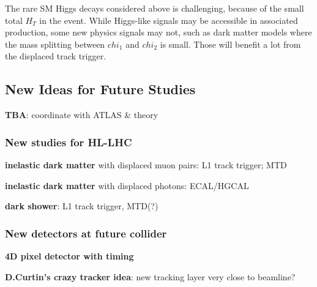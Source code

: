 The rare SM Higgs decays considered above is challenging, because of the small total $H_T$ in the event. 
While Higgs-like signals may be accessible in associated production, some new physics signals may not, such as dark matter models where the mass splitting between $chi_1$ and $chi_2$ is small. 
Those will benefit a lot from the displaced track trigger.

\subsection{New Ideas for Future Studies} \label{sec:upgradeideas}

\textbf{TBA}: coordinate with ATLAS \& theory

\subsubsection{New studies for HL-LHC} 

\textbf{inelastic dark matter} with displaced muon pairs: L1 track trigger; MTD

\textbf{inelastic dark matter} with displaced photons: ECAL/HGCAL

\textbf{dark shower}: L1 track trigger, MTD(?)

\subsubsection{New detectors at future collider}

\textbf{4D pixel detector with timing} 

\textbf{D.Curtin's crazy tracker idea}: new tracking layer very close to beamline?
